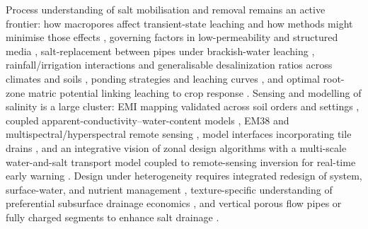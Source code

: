 \documentclass[11pt]{article}
\begin{document}
Process understanding of salt mobilisation and removal remains an active frontier:
how macropores affect transient-state leaching and how methods might minimise those
effects \parencite{Xin2016}, governing factors in low-permeability and structured
media \parencite{Zhang2022}, salt-replacement between pipes under brackish-water
leaching \parencite{Li2023}, rainfall/irrigation interactions and generalisable
desalinization ratios across climates and soils
\parencite{Yu2015,Chen2025,Wang2024d}, ponding strategies and leaching curves
\parencite{RAO1991,Yang2022c}, and optimal root-zone matric potential linking
leaching to crop response \parencite{Zhang2021,Heng2021}. Sensing and modelling of
salinity is a large cluster: EMI mapping validated across soil orders and settings
\parencite{Narjary2024}, coupled apparent-conductivity--water-content models
\parencite{Yu2025}, EM38 and multispectral/hyperspectral remote sensing
\parencite{Singh2020d}, model interfaces incorporating tile drains
\parencite{Singh2020d,Jayawardane2001}, and an integrative vision of zonal design
algorithms with a multi-scale water-and-salt transport model coupled to
remote-sensing inversion for real-time early warning \parencite{Zhu2025b}.
Design under heterogeneity requires integrated redesign of system, surface-water,
and nutrient management \parencite{vandenEertwegh2006}, texture-specific
understanding of preferential subsurface drainage economics \parencite{Neha2022},
and vertical porous flow pipes or fully charged segments to enhance salt drainage
\parencite{Wang2024d,Yao2024,Jayawardane2001}.
\end{document}
